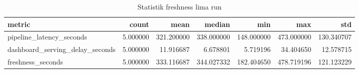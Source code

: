 \begin{table}
\caption{Statistik freshness lima run}
\label{tab:freshness-statistik}
\begin{tabular}{lrrrrrr}
\toprule
metric & count & mean & median & min & max & std \\
\midrule
pipeline_latency_seconds & 5.000000 & 321.200000 & 338.000000 & 148.000000 & 473.000000 & 130.340707 \\
dashboard_serving_delay_seconds & 5.000000 & 11.916687 & 6.678801 & 5.719196 & 34.404650 & 12.578715 \\
freshness_seconds & 5.000000 & 333.116687 & 344.027332 & 182.404650 & 478.719196 & 121.123229 \\
\bottomrule
\end{tabular}
\end{table}

